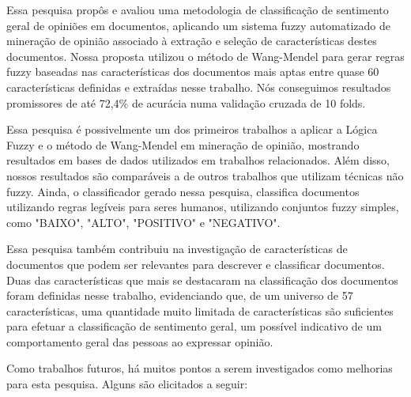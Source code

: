 \documentclass[template.tex]{subfiles}
\begin{document}

Essa pesquisa propôs e avaliou  uma metodologia de classificação de sentimento geral de opiniões em documentos, aplicando um sistema fuzzy automatizado de mineração de opinião associado à extração e seleção de características destes documentos. Nossa proposta utilizou o método de Wang-Mendel \cite{wang1992generating} para gerar regras fuzzy baseadas nas características dos documentos mais aptas entre quase 60 características definidas e extraídas nesse trabalho. Nós conseguimos resultados promissores de até 72,4\% de acurácia numa validação cruzada de 10 folds.

Essa pesquisa é possivelmente um dos primeiros trabalhos a aplicar a Lógica Fuzzy e o método de Wang-Mendel em mineração de opinião, mostrando resultados em bases de dados utilizados em trabalhos relacionados. Além disso, nossos resultados são comparáveis a de outros trabalhos que utilizam técnicas não fuzzy. Ainda, o classificador gerado nessa pesquisa, classifica documentos utilizando regras legíveis para seres humanos, utilizando conjuntos fuzzy simples, como "BAIXO", "ALTO", "POSITIVO" e "NEGATIVO".


Essa pesquisa também contribuiu na investigação de características de documentos que podem ser relevantes para descrever e classificar documentos. Duas das características que mais se destacaram na classificação dos documentos foram definidas nesse trabalho, evidenciando que, de um universo de 57 características, uma quantidade muito limitada de características são suficientes para efetuar a classificação de sentimento geral, um possível indicativo de um comportamento geral das pessoas ao expressar opinião.

Como trabalhos futuros, há muitos pontos a serem investigados como melhorias para esta pesquisa. Alguns são elicitados a seguir:
\end{document}
